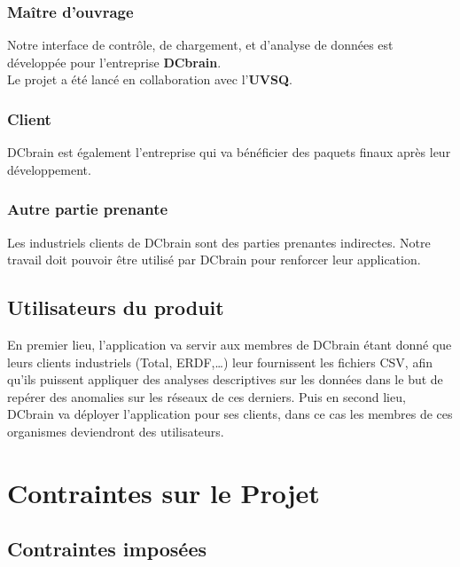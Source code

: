 			\subsubsection{Maître d'ouvrage}
			Notre interface de contrôle, de chargement, et d'analyse de données est développée pour l'entreprise \textbf{DCbrain}.\\
			Le projet a été lancé en collaboration avec l'\textbf{UVSQ}.
			
			\subsubsection{Client}
			DCbrain est également l'entreprise qui va bénéficier des paquets finaux après leur développement.
			
			\subsubsection{Autre partie prenante}
			Les industriels clients de DCbrain sont des parties prenantes indirectes. Notre travail doit pouvoir être utilisé par DCbrain pour renforcer leur application.
			
		\subsection{Utilisateurs du produit}
		En premier lieu, l’application va servir aux membres de DCbrain étant donné que leurs clients industriels (Total, ERDF,…) leur fournissent les fichiers CSV, afin qu’ils puissent appliquer des analyses descriptives sur les données dans le but de repérer des anomalies sur les réseaux de ces derniers. Puis en second lieu, DCbrain va déployer l'application pour ses clients, dans ce cas les membres de ces organismes deviendront des utilisateurs.\\


	\section{Contraintes sur le Projet}
		\subsection{Contraintes imposées}
